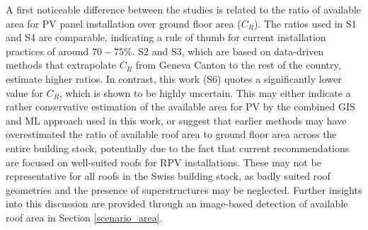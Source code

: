 A first noticeable difference between the studies is related to the ratio of available area for PV panel installation over ground floor area ($C_R$). The ratios used in S1 and S4 are comparable, indicating a rule of thumb for current installation practices of around $70 - 75$\%. S2 and S3, which are based on data-driven methods that extrapolate $C_R$ from Geneva Canton to the rest of the country, estimate higher ratios. 
In contrast, this work (S6) quotes a significantly lower value for $C_R$, which is shown to be highly uncertain.
This may either indicate a rather conservative estimation of the available area for PV by the combined GIS and ML approach used in this work, or suggest that earlier methods may have overestimated the ratio of available roof area to ground floor area across the entire building stock, potentially due to the fact that current recommendations are focused on well-suited roofs for RPV installations. 
These may not be representative for all roofs in the Swiss building stock, as badly suited roof geometries and the presence of superstructures may be neglected. 
Further insights into this discussion are provided through an image-based detection of available roof area in Section \ref{scenario_area}.

